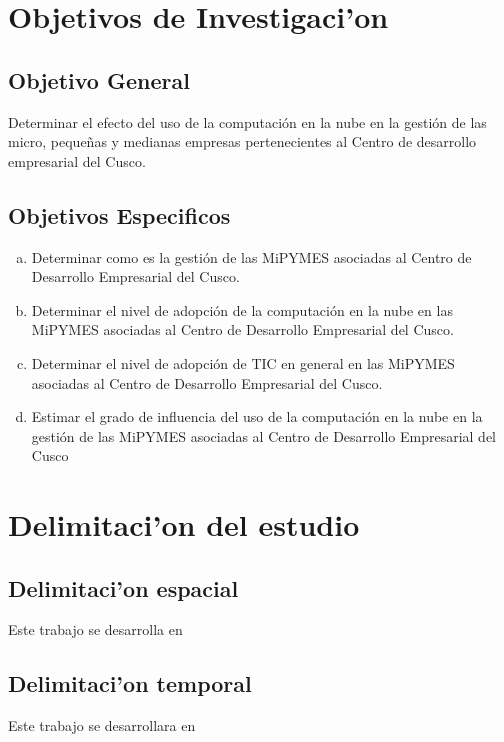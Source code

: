 \section{Objetivos de Investigaci'on}
\subsection{Objetivo General}
Determinar el efecto del uso de la computaci\'on en la nube en la gesti\'on de
las micro, peque\~nas y medianas empresas pertenecientes al Centro de desarrollo
empresarial del Cusco.
\subsection{Objetivos Especificos}
\begin{enumerate}[a.]
\item Determinar como es la gesti\'on de las MiPYMES asociadas al Centro de
Desarrollo Empresarial del Cusco.
\item Determinar el nivel de adopci\'on de la computaci\'on en la nube en las
MiPYMES asociadas al Centro de Desarrollo Empresarial del Cusco.
\item Determinar el nivel de adopci\'on de TIC en general en las MiPYMES
asociadas al Centro de Desarrollo Empresarial del Cusco.
\item Estimar el grado de influencia del uso de la computaci\'on en la nube
en la gesti\'on de las MiPYMES asociadas al Centro de Desarrollo Empresarial
del Cusco
\end{enumerate}
\section{Delimitaci'on del estudio}
\subsection{Delimitaci'on espacial}
Este trabajo se desarrolla en
\subsection{Delimitaci'on temporal}
Este trabajo se desarrollara en

